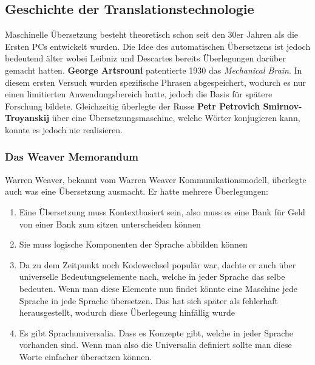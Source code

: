 \documentclass{article}
\begin{document}
	\subsection{Geschichte der Translationstechnologie}
	Maschinelle Übersetzung besteht theoretisch schon seit den 30er Jahren als die Ersten PCs entwickelt wurden. Die Idee des automatischen Übersetzens ist jedoch bedeutend älter wobei Leibniz und Descartes bereits Überlegungen darüber gemacht hatten.
	\textbf{George Artsrouni} patentierte 1930 das \textit{Mechanical Brain}. In diesem ersten Versuch wurden spezifische Phrasen abgespeichert, wodurch es nur einen limitierten Anwendungsbereich hatte, jedoch die Basis für spätere Forschung bildete.
	Gleichzeitig überlegte der Russe \textbf{Petr Petrovich Smirnov-Troyanskij} über eine Übersetzungsmaschine, welche Wörter konjugieren kann, konnte es jedoch nie realisieren. \\
	\subsubsection{Das Weaver Memorandum}
	Warren Weaver, bekannt vom Warren Weaver Kommunikationsmodell, überlegte auch was eine Übersetzung ausmacht. Er hatte mehrere Überlegungen: \\
	\begin{enumerate}
		\item{Eine Übersetzung muss Kontextbasiert sein, also muss es eine Bank für Geld von einer Bank zum sitzen unterscheiden können}
		\item{Sie muss logische Komponenten der Sprache abbilden können}
		\item{Da zu dem Zeitpunkt noch Kodewechsel populär war, dachte er auch über universelle Bedeutungselemente nach, welche in jeder Sprache das selbe bedeuten. Wenn man diese Elemente nun findet könnte eine Maschine jede Sprache in jede Sprache übersetzen. Das hat sich später als fehlerhaft herausgestellt, wodurch diese Überlegeung hinfällig wurde}
		\item{Es gibt Sprachuniversalia. Dass es Konzepte gibt, welche in jeder Sprache vorhanden sind. Wenn man also die Universalia definiert sollte man diese Worte einfacher übersetzen können.}
	\end{enumerate}
\end{document}

